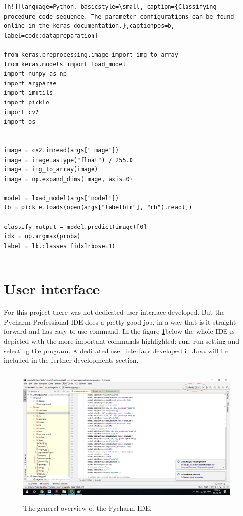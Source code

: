 \documentclass[12pt,a4paper,twoside]{report}
\begin{document}
\begin{lstlisting}[h!][language=Python, basicstyle=\small, caption={Classifying procedure code sequence. The parameter configurations can be found online in the keras documentation.},captionpos=b, label=code:datapreparation]

from keras.preprocessing.image import img_to_array
from keras.models import load_model
import numpy as np
import argparse
import imutils
import pickle
import cv2
import os


image = cv2.imread(args["image"])
image = image.astype("float") / 255.0
image = img_to_array(image)
image = np.expand_dims(image, axis=0)

model = load_model(args["model"])
lb = pickle.loads(open(args["labelbin"], "rb").read())

classify_output = model.predict(image)[0]
idx = np.argmax(proba)
label = lb.classes_[idx]rbose=1)
 
\end{lstlisting}




\section{User interface}
For this project there was not dedicated user interface developed. But the Pycharm Professional IDE does a pretty good job, in a way that is it straight forward and has easy to use command. In the figure \ref{fig:imagesystemui}below the whole IDE is depicted with the more important commands highlighted: run, run setting and selecting the program. A dedicated user interface developed in Java will be included in the further developments section.
\begin{figure}[h!]
	\centering
	\includegraphics[width=12cm, height=7cm]{img/data/userinterface.png}
	\caption[]
	{The general overview of the Pycharm IDE.}
	\label{fig:imagesystemui}
\end{figure}\par
\end{document}
